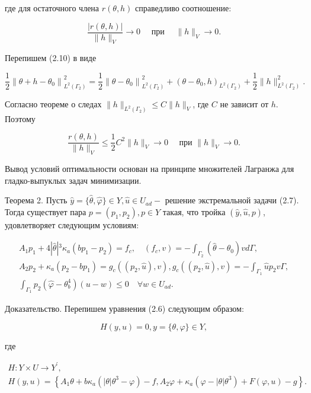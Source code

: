 \documentclass[10pt]{article}
\begin{document}
где для остаточного члена $r(\theta, h)$ справедливо соотношение:

$$
\frac{|r(\theta, h)|}{\|h\|_{V}} \rightarrow 0 \quad \text { при } \quad\|h\|_{V} \rightarrow 0 .
$$

Перепишем (2.10) в виде

$$
\frac{1}{2}\left\|\theta+h-\theta_{0}\right\|_{L^{2}\left(\Gamma_{2}\right)}^{2}=\frac{1}{2}\left\|\theta-\theta_{0}\right\|_{L^{2}\left(\Gamma_{2}\right)}^{2}+\left(\theta-\theta_{0}, h\right)_{L^{2}\left(\Gamma_{2}\right)}+\frac{1}{2}\|h\|_{L^{2}\left(\Gamma_{2}\right)}^{2} .
$$

Согласно теореме о следах $\|h\|_{L^{2}\left(\Gamma_{2}\right)} \leqslant C\|h\|_{V}$, где $C$ не зависит от $h$. Поэтому

$$
\frac{r(\theta, h)}{\|h\|_{V}} \leqslant \frac{1}{2} C^{2}\|h\|_{V} \rightarrow 0 \quad \text { при }\|h\|_{V} \rightarrow 0 .
$$

Вывод условий оптимальности основан на принципе множителей Лагранжа для гладко-выпуклых задач минимизации.

Теорема 2. Пусть $\hat{y}=\{\hat{\theta}, \hat{\varphi}\} \in Y, \hat{u} \in U_{a d}-$ решение экстремальной задачи (2.7). Тогда существует пара $p=\left(p_{1}, p_{2}\right), p \in Y$ такая, что тройка $(\hat{y}, \hat{u}, p)$, удовлетворяет следующим условиям:

$$
\begin{gathered}
A_{1} p_{1}+4|\hat{\theta}|{ }^{3} \kappa_{a}\left(b p_{1}-p_{2}\right)=f_{c}, \quad\left(f_{c}, v\right)=-\int_{\Gamma_{2}}\left(\hat{\theta}-\theta_{0}\right) v d \Gamma, \\
A_{2} p_{2}+\kappa_{a}\left(p_{2}-b p_{1}\right)=g_{c}\left(\left(p_{2}, \hat{u}\right), v\right), g_{c}\left(\left(p_{2}, \hat{u}\right), v\right)=-\int_{\Gamma_{1}} \hat{u} p_{2} v \Gamma, \\
\int_{\Gamma_{1}} p_{2}\left(\hat{\varphi}-\theta_{b}^{4}\right)(u-w) \leqslant 0 \quad \forall w \in U_{a d} .
\end{gathered}
$$

Доказательство. Перепишем уравнения (2.6) следующим образом:

$$
H(y, u)=0, y=\{\theta, \varphi\} \in Y,
$$

где

$$
\begin{gathered}
H: Y \times U \rightarrow Y^{\prime}, \\
H(y, u)=\left\{A_{1} \theta+b \kappa_{a}\left(|\theta| \theta^{3}-\varphi\right)-f, A_{2} \varphi+\kappa_{a}\left(\varphi-|\theta| \theta^{3}\right)+F(\varphi, u)-g\right\} .
\end{gathered}
$$
\end{document}
